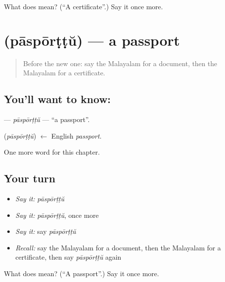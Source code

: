 \begin{tcolorbox}[breakable,colback=teal!4,colframe=teal!35!black,title={Before you move on}]
What does  mean? (\textquotedblleft{}A certificate\textquotedblright{}.) Say it once more.
\end{tcolorbox}
\section[\texorpdfstring{\ml{പാസ്പോർട്ട്} (pāspōrṭṭŭ)}{പാസ്പോർട്ട് (pāspōrṭṭŭ)}]{ (pāspōrṭṭŭ) — a passport}

\label{lesson:ML-C324-pasporttu}



\begin{quote}
Before the new one: say the Malayalam for a document, then the Malayalam for a certificate.
\end{quote}

\subsection*{You'll want to know: }
\textbf{} — \emph{pāspōrṭṭŭ} — \textquotedblleft{}a passport\textquotedblright{}.

\begin{cousinweb}
\textbf{} (\emph{pāspōrṭṭŭ}) $\leftarrow$ English \emph{passport}.
\end{cousinweb}

\begin{grammarlens}[title={What you've built}]
One more word for this chapter.
\end{grammarlens}

\subsection*{Your turn}
\begin{itemize}
\raggedright
  \item \emph{Say it:} \emph{pāspōrṭṭŭ}
  \item \emph{Say it:} \emph{pāspōrṭṭŭ}, once more
  \item \emph{Say it:} say \emph{pāspōrṭṭŭ}
  \item \emph{Recall:} say the Malayalam for a document, then the Malayalam for a certificate, then say \emph{pāspōrṭṭŭ} again
\end{itemize}

\begin{tcolorbox}[breakable,colback=teal!4,colframe=teal!35!black,title={Before you move on}]
What does  mean? (\textquotedblleft{}A passport\textquotedblright{}.) Say it once more.
\end{tcolorbox}
